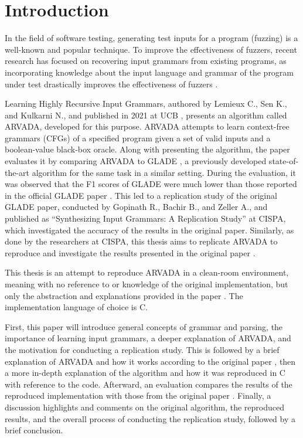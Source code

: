 \chapter{Introduction}

In the field of software testing, generating test inputs for a program (fuzzing) is a well-known and popular technique. To improve the effectiveness of fuzzers, recent research has focused on recovering input grammars from existing programs, as incorporating knowledge about the input language and grammar of the program under test drastically improves the effectiveness of fuzzers \cite{gopinathBuildingFastFuzzers2019}.

Learning Highly Recursive Input Grammars, authored by Lemieux C., Sen K., and Kulkarni N., and published in 2021 at UCB \cite{kulkarniLearningHighlyRecursive2021}, presents an algorithm called ARVADA, developed for this purpose. ARVADA attempts to learn context-free grammars (CFGs) of a specified program given a set of valid inputs and a boolean-value black-box oracle. Along with presenting the algorithm, the paper evaluates it by comparing ARVADA to GLADE \cite{bastaniSynthesizingProgramInput}, a previously developed state-of-the-art algorithm for the same task in a similar setting.
During the evaluation, it was observed that the F1 scores of GLADE were much lower than those reported in the official GLADE paper \cite{bastaniSynthesizingProgramInput}. This led to a replication study of the original GLADE paper, conducted by Gopinath R., Bachir B., and Zeller A., and published as “Synthesizing Input Grammars: A Replication Study” \cite{bendrissouSynthesizingInputGrammars2022} at CISPA, which investigated the accuracy of the results in the original paper. Similarly, as done by the researchers at CISPA, this thesis aims to replicate ARVADA to reproduce and investigate the results presented in the original paper \cite{kulkarniLearningHighlyRecursive2021}.

This thesis is an attempt to reproduce ARVADA in a clean-room environment, meaning with no reference to or knowledge of the original implementation, but only the abstraction and explanations provided in the paper \cite{kulkarniLearningHighlyRecursive2021}. The implementation language of choice is C.

First, this paper will introduce general concepts of grammar and parsing, the importance of learning input grammars, a deeper explanation of ARVADA, and the motivation for conducting a replication study. This is followed by a brief explanation of ARVADA and how it works according to the original paper \cite{kulkarniLearningHighlyRecursive2021}, then a more in-depth explanation of the algorithm and how it was reproduced in C with reference to the code. Afterward, an evaluation compares the results of the reproduced implementation with those from the original paper \cite{kulkarniLearningHighlyRecursive2021}. Finally, a discussion highlights and comments on the original algorithm, the reproduced results, and the overall process of conducting the replication study, followed by a brief conclusion.

